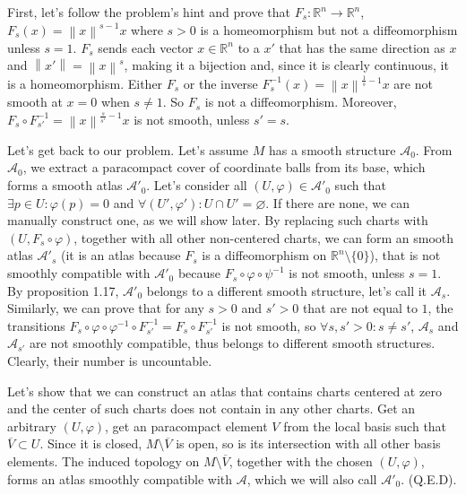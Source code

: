 \documentclass[a4paper]{article}
\begin{document}
\begin{exercise}[1-6]
    First, let's follow the problem's hint and prove that $F_s \colon \mathbb{R}^n \to \mathbb{R}^n$,
    $F_s(x) = \left\| x \right\|^{s-1} x$ where $s>0$ is a homeomorphism but not a diffeomorphism
    unless $s=1$. $F_s$ sends each vector $x \in \mathbb{R}^n$ to a $x'$ that has
    the same direction as $x$ and $\left\| x' \right\| = \left\| x \right\|^s$, making
    it a bijection and, since it is clearly continuous, it is a homeomorphism.
    Either $F_s$ or the inverse $F_s^{-1} (x) = \left\| x \right\|^{\frac{1}{s} - 1} x$
    are not smooth at $x=0$ when $s \ne 1$. So $F_s$ is not a diffeomorphism.
    Moreover, $F_s \circ F_{s'}^{-1} = \left\| x \right\|^{\frac{s}{s'} - 1} x$ is not smooth, 
    unless $s' = s$.

    Let's get back to our problem. Let's assume $M$ has a smooth structure $\mathcal{A}_0$.
    From $\mathcal{A}_0$, we extract a paracompact cover of coordinate balls from its base,
    which forms a smooth atlas $\mathcal{A}'_0$. Let's consider all $(U, \varphi) \in \mathcal{A}'_0$
    such that $\exists p \in U \colon \varphi(p) = 0$ and $\forall (U', \varphi') \colon U\cap U' = \varnothing$.
    If there are none, we can manually construct one, as we will show later.
    By replacing such charts with $(U, F_s \circ \varphi)$, together with all
    other non-centered charts, we can form an smooth atlas $\mathcal{A}'_s$
    (it is an atlas because $F_s$ is a diffeomorphism on $\mathbb{R}^n \setminus \{0\}$),
    that is not smoothly compatible with $\mathcal{A}'_0$ because $F_s \circ \varphi \circ \psi^{-1} $ is not smooth, unless $s=1$.
    By proposition 1.17, $\mathcal{A}'_0$ belongs to a different smooth structure,
    let's call it $\mathcal{A}_s$. Similarly, we can prove that for any $s>0$ and $s'>0$
    that are not equal to $1$, the transitions $F_s \circ \varphi \circ \varphi^{-1} \circ F_{s'}^{-1} = F_s \circ F_{s'}^{-1} $
    is not smooth, so $\forall s,s'>0 \colon s \ne s'$, $\mathcal{A}_s$ and
    $\mathcal{A}_{s'}$ are not smoothly compatible, thus belongs to different
    smooth structures. Clearly, their number is uncountable.

    Let's show that we can construct an atlas that contains charts centered at
    zero and the center of such charts does not contain in any other charts.
    Get an arbitrary $(U, \varphi)$,
    get an paracompact element $V$ from the local basis such that $\overline{V} \subset U$.
    Since it is closed, $M \setminus \overline{V}$ is open, so is its intersection
    with all other basis elements. The induced topology on $M \setminus \overline{V}$,
    together with the chosen $(U, \varphi)$, forms an atlas smoothly compatible
    with $\mathcal{A}$, which we will also call $\mathcal{A}'_0$. (Q.E.D).
\end{exercise}
\end{document}
